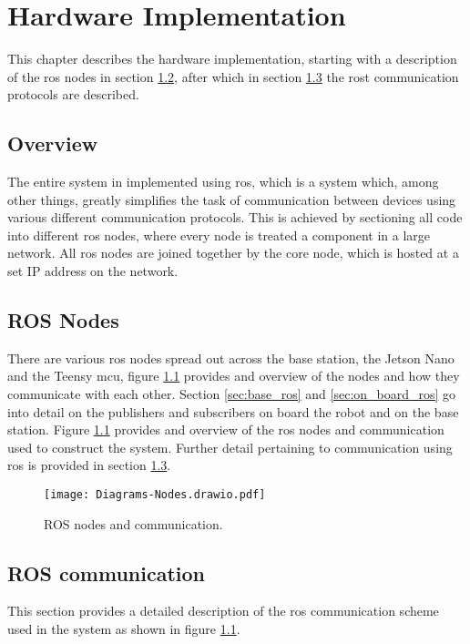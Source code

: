 \chapter{Hardware Implementation} \label{chap:hardware}
This chapter describes the hardware implementation, starting with a description of the \ac{ros} nodes in section \ref{sec:ros_nodes},
after which in section \ref{sec:ros_comms} the rost communication protocols are described.

\section{Overview}
The entire system in implemented using \ac{ros}, which is a system which, among other things, greatly simplifies the task of
communication between devices using various different communication protocols. This is achieved by sectioning all code into different
\ac{ros} nodes, where every node is treated a component in a large network. All ros nodes are joined together by the core node,
which is hosted at a set IP address on the network.

\newpage
\section{ROS Nodes} \label{sec:ros_nodes}
There are various ros nodes spread out across the base station, the Jetson Nano and the Teensy \ac{mcu}, figure \ref{fig:nodes} provides and overview
of the nodes and how they communicate with each other. Section \ref{sec:base_ros} and \ref{sec:on_board_ros} go into detail on the publishers and subscribers
on board the robot and on the base station. Figure \ref{fig:nodes} provides and overview of the \ac{ros} nodes and communication used to construct the system.
Further detail pertaining to communication using \ac{ros} is provided in section \ref{sec:ros_comms}.

\begin{figure}[h]
    \centering
    \texttt{[image: Diagrams-Nodes.drawio.pdf]}
    \caption{ROS nodes and communication.}
    \label{fig:nodes}
\end{figure}

\section{ROS communication} \label{sec:ros_comms}
    This section provides a detailed description of the \ac{ros} communication scheme used in the system as shown in figure \ref{fig:nodes}.
